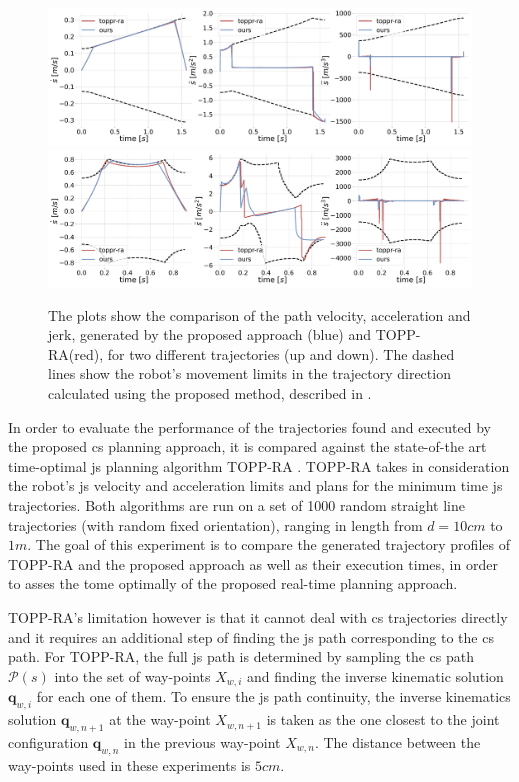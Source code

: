 \begin{figure}[!t]
    \centering
    \includegraphics[width=\linewidth]{Papers/imgs/ruckig_toppra_comp1679478306.pdf}
    \includegraphics[width=\linewidth]{Papers/imgs/ruckig_toppra_comp1681374566.pdf}
    \caption{The plots show the comparison of the path velocity, acceleration and jerk, generated by the proposed approach (blue) and TOPP-RA(red), for two different trajectories (up and down). The dashed lines show the robot's movement limits in the trajectory direction calculated using the proposed method, described in . }
    \label{fig:comparison_trajectory}
\end{figure}

In order to evaluate the performance of the trajectories found and executed by the proposed \gls{cs} planning approach, it is compared against the state-of-the art time-optimal \gls{js} planning algorithm TOPP-RA \cite{Pham2018}. TOPP-RA takes in consideration the robot's \gls{js} velocity and acceleration limits and plans for the minimum time \gls{js} trajectories.
Both algorithms are run on a set of 1000 random straight line trajectories (with random fixed orientation), ranging in length from $d=10cm$ to $1m$. The goal of this experiment is to compare the generated trajectory profiles of TOPP-RA and the proposed approach as well as their execution times, in order to asses the tome optimally of the proposed real-time planning approach. 

TOPP-RA's limitation however is that it cannot deal with \gls{cs} trajectories directly and it requires an additional step of finding the \gls{js} path corresponding to the \gls{cs} path. For TOPP-RA, the full \gls{js} path is determined by sampling the \gls{cs} path $\mathscr{P}(s)$ into the set of way-points $X_{w,i}$ and finding the inverse kinematic solution $\bm{q}_{w,i}$ for each one of them. To ensure the \gls{js} path continuity, the inverse kinematics solution $\bm{q}_{w,n+1}$ at the way-point $X_{w,n+1}$ is taken as the one closest to the joint configuration $\bm{q}_{w,n}$ in the previous way-point $X_{w,n}$. The distance between the way-points used in these experiments is $5cm$. 


